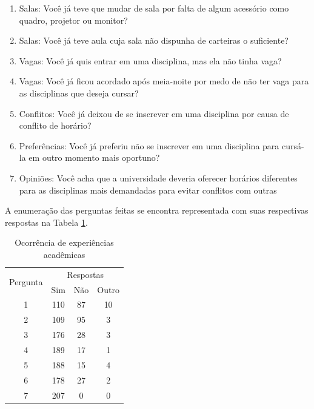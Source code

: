         \begin{enumerate}
            \item Salas: Você já teve que mudar de sala por falta de algum acessório como quadro, projetor ou monitor? %
            \item Salas: Você já teve aula cuja sala não dispunha de carteiras o suficiente? %
            \item Vagas: Você já quis entrar em uma disciplina, mas ela não tinha vaga? %
            \item Vagas: Você já ficou acordado após meia-noite por medo de não ter vaga para as disciplinas que deseja cursar? %
            \item Conflitos: Você já deixou de se inscrever em uma disciplina por causa de conflito de horário? %
            \item Preferências: Você já preferiu não se inscrever em uma disciplina para cursá-la em outro momento mais oportuno? %
            \item Opiniões: Você acha que a universidade deveria oferecer horários diferentes para as disciplinas mais demandadas para evitar conflitos com outras  %
        \end{enumerate}

        A enumeração das perguntas feitas se encontra representada com suas respectivas respostas na Tabela \ref{table:3.0_satisfacao}.

        \begin{table}[htbp]
            \centering
            \caption{\label{table:3.0_satisfacao}Ocorrência de experiências acadêmicas}
            \begin{tabular}{| c | c c c |}
                \hline
                    \multicolumn{1}{|c|}{\multirow{2}{*}{Pergunta}} & \multicolumn{3}{c|}{Respostas}
                    \\
                    \multicolumn{1}{|c|}{} &
                    Sim &
                    \multicolumn{1}{|c|}{Não} &
                    Outro
                    \\
                \hline
                    1 & 110 & 87 & 10 \\ %
                    2 & 109 & 95 &  3 \\ %
                    3 & 176 & 28 &  3 \\ %
                    4 & 189 & 17 &  1 \\ %
                    5 & 188 & 15 &  4 \\ %
                    6 & 178 & 27 &  2 \\ %
                    7 & 207 &  0 &  0 \\ %
                \hline
            \end{tabular}
        \end{table}

